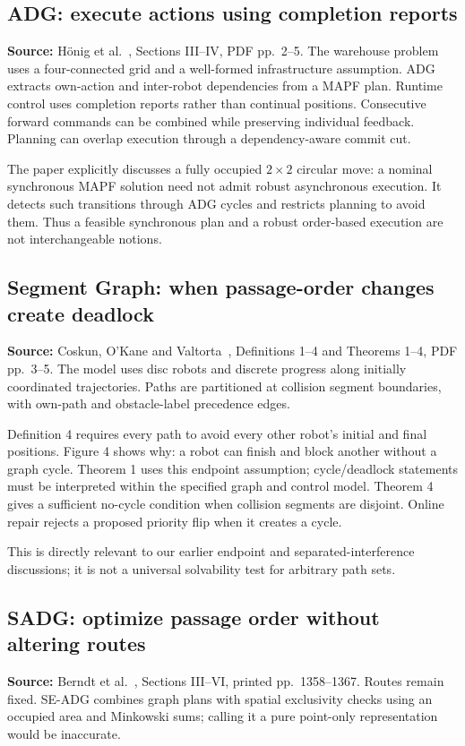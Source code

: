 \documentclass[11pt,a4paper]{article}
\begin{document}
\subsection{ADG: execute actions using completion reports}
\textbf{Source:} H\"onig et al.~\cite{adg}, Sections III--IV, PDF pp.~2--5.
The warehouse problem uses a four-connected grid and a well-formed infrastructure
assumption. ADG extracts own-action and inter-robot dependencies from a MAPF plan.
Runtime control uses completion reports rather than continual positions.
Consecutive forward commands can be combined while preserving individual
feedback. Planning can overlap execution through a dependency-aware commit cut.

The paper explicitly discusses a fully occupied $2\times2$ circular move:
a nominal synchronous MAPF solution need not admit robust asynchronous execution.
It detects such transitions through ADG cycles and restricts planning to avoid
them. Thus a feasible synchronous plan and a robust order-based execution are
not interchangeable notions.

\subsection{Segment Graph: when passage-order changes create deadlock}
\textbf{Source:} Coskun, O'Kane and Valtorta~\cite{sg}, Definitions 1--4 and
Theorems 1--4, PDF pp.~3--5. The model uses disc robots and discrete progress
along initially coordinated trajectories. Paths are partitioned at collision
segment boundaries, with own-path and obstacle-label precedence edges.

Definition 4 requires every path to avoid every other robot's initial and final
positions. Figure 4 shows why: a robot can finish and block another without a
graph cycle. Theorem 1 uses this endpoint assumption; cycle/deadlock statements
must be interpreted within the specified graph and control model. Theorem 4
gives a sufficient no-cycle condition when collision segments are disjoint.
Online repair rejects a proposed priority flip when it creates a cycle.

This is directly relevant to our earlier endpoint and separated-interference
discussions; it is not a universal solvability test for arbitrary path sets.

\subsection{SADG: optimize passage order without altering routes}
\textbf{Source:} Berndt et al.~\cite{sadg}, Sections III--VI, printed
pp.~1358--1367. Routes remain fixed. SE-ADG combines graph plans with spatial
exclusivity checks using an occupied area and Minkowski sums; calling it a
pure point-only representation would be inaccurate.
\end{document}
